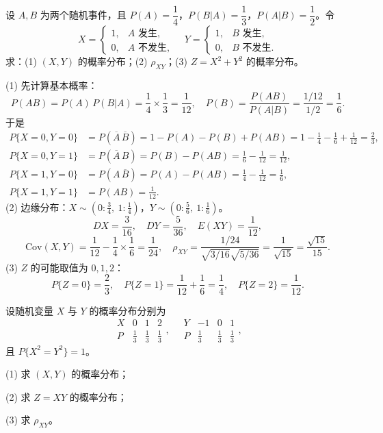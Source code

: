 ﻿\documentclass[lang=cn,11pt]{elegantbook}
\begin{document}
\begin{exercise}\label{exer:4-s13-event}
设 \(A, B\) 为两个随机事件，且 \(P(A) = \dfrac{1}{4}\)，\(P(B|A) = \dfrac{1}{3}\)，\(P(A|B) = \dfrac{1}{2}\)。令
\[
X = \begin{cases} 1, & A \text{ 发生}, \\ 0, & A \text{ 不发生}, \end{cases}\quad
Y = \begin{cases} 1, & B \text{ 发生}, \\ 0, & B \text{ 不发生}. \end{cases}
\]
求：(1) \((X,Y)\) 的概率分布；(2) \(\rho_{XY}\)；(3) \(Z = X^2 + Y^2\) 的概率分布。
\end{exercise}
\begin{solution}
(1) 先计算基本概率：
\[
P(AB) = P(A)\,P(B|A) = \frac{1}{4} \times \frac{1}{3} = \frac{1}{12},\quad
P(B) = \frac{P(AB)}{P(A|B)} = \frac{1/12}{1/2} = \frac{1}{6}.
\]
于是
\begin{align*}
P\{X=0,Y=0\} &= P(\overline{A}\,\overline{B}) = 1 - P(A) - P(B) + P(AB) = 1 - \frac{1}{4} - \frac{1}{6} + \frac{1}{12} = \frac{2}{3}, \\
P\{X=0,Y=1\} &= P(\overline{A}\,B) = P(B) - P(AB) = \frac{1}{6} - \frac{1}{12} = \frac{1}{12}, \\
P\{X=1,Y=0\} &= P(A\,\overline{B}) = P(A) - P(AB) = \frac{1}{4} - \frac{1}{12} = \frac{1}{6}, \\
P\{X=1,Y=1\} &= P(AB) = \frac{1}{12}.
\end{align*}
(2) 边缘分布：\(X \sim (0:\frac{3}{4},\ 1:\frac{1}{4})\)，\(Y \sim (0:\frac{5}{6},\ 1:\frac{1}{6})\)。
\[
DX = \frac{3}{16},\quad DY = \frac{5}{36},\quad E(XY) = \frac{1}{12},
\]
\[
\mathrm{Cov}(X,Y) = \frac{1}{12} - \frac{1}{4} \times \frac{1}{6} = \frac{1}{24},\quad
\rho_{XY} = \frac{1/24}{\sqrt{3/16}\sqrt{5/36}} = \frac{1}{\sqrt{15}} = \frac{\sqrt{15}}{15}.
\]
(3) \(Z\) 的可能取值为 \(0, 1, 2\)：
\[
P\{Z=0\} = \frac{2}{3},\quad P\{Z=1\} = \frac{1}{12}+\frac{1}{6} = \frac{1}{4},\quad P\{Z=2\} = \frac{1}{12}.
\]
\end{solution}

\begin{exercise}\label{exer:4-7-joint}
设随机变量 \(X\) 与 \(Y\) 的概率分布分别为
\[
\begin{array}{c|ccc}
X & 0 & 1 & 2 \\
\hline
P & \frac{1}{3} & \frac{1}{3} & \frac{1}{3}
\end{array},\quad
\begin{array}{c|ccc}
Y & -1 & 0 & 1 \\
\hline
P & \frac{1}{3} & \frac{1}{3} & \frac{1}{3}
\end{array},
\]
且 \(P\{X^2 = Y^2\} = 1\)。\par
(1) 求 \((X,Y)\) 的概率分布；\par
(2) 求 \(Z = XY\) 的概率分布；\par
(3) 求 $\rho_{XY}$。
\end{exercise}
\end{document}
